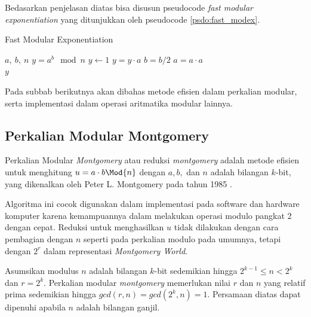 Bedasarkan penjelasan diatas bisa disusun pseudocode \textit{fast modular exponentiation} yang ditunjukkan oleh pseudocode \ref{psdo:fast_modex}.

\begin{algorithm}
	\caption{Fast Modular Exponentiation}
	\label{psdo:fast_modex}
	\begin{algorithmic}[1]
		\Require $a,\ b,\ n$
		\Ensure $y = a^b\mod{n}$
		\State $y \leftarrow 1$
				\State $ y = y \cdot a $
			\EndIf
			\State $ b = b / 2 $
			\State $ a = a \cdot a $
		\EndWhile \\
		\Return $ y $
	\end{algorithmic}
\end{algorithm}

Pada subbab berikutnya akan dibahas metode efisien dalam perkalian modular, serta implementasi dalam operasi aritmatika modular lainnya.

\subsection{Perkalian Modular Montgomery}
Perkalian Modular \textit{Montgomery} atau reduksi \textit{montgomery} adalah metode efisien untuk menghitung $ u = a \cdot b \Mod{n} $ dengan $ a, b, $ dan $ n $ adalah  bilangan $k$-bit, yang dikenalkan oleh Peter L. Montgomery pada tahun 1985 \cite{montgomery}. 

Algoritma ini cocok digunakan dalam implementasi pada software dan hardware komputer karena kemampuannya dalam melakukan operasi modulo pangkat 2 dengan cepat. Reduksi untuk menghasilkan $ u $ tidak dilakukan dengan cara pembagian dengan $ n $ seperti pada perkalian modulo pada umumnya, tetapi dengan $ 2^r $ dalam representasi \textit{Montgomery World}.

Asumsikan modulus $ n $ adalah bilangan $k$-bit sedemikian hingga $ 2^{k-1} \leq n < 2^{k} $ dan $ r = 2^{k}$. Perkalian modular \textit{montgomery} memerlukan nilai $ r $ dan $ n $ yang relatif prima sedemikian hingga $ gcd(r, n) = gcd(2^k, n) = 1 $. Persamaan diatas dapat dipenuhi apabila $ n $ adalah bilangan ganjil.

